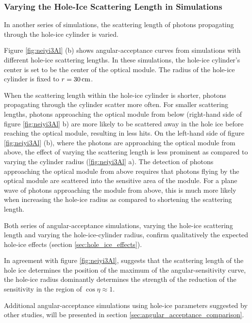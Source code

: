 \subsubsection{Varying the Hole-Ice Scattering Length in Simulations}
\label{sec:vary_sca}

In another series of simulations, the scattering length of photons
propagating through the hole-ice cylinder is varied.


Figure \ref{fig:neiyi3Al} (b) shows angular-acceptance curves from
simulations with different hole-ice scattering lengths. In these
simulations, the hole-ice cylinder's center is set to be the center of
the optical module. The radius of the hole-ice cylinder is fixed to
\(r = 30\text{\,cm}\).

When the scattering length within the hole-ice cylinder is shorter,
photons propagating through the cylinder scatter more often. For smaller
scattering lengths, photons approaching the optical module from below
(right-hand side of figure \ref{fig:neiyi3Al} b) are more likely to be
scattered away in the hole ice before reaching the optical module,
resulting in less hits. On the left-hand side of figure
\ref{fig:neiyi3Al} (b), where the photons are approaching the optical
module from above, the effect of varying the scattering length is less
prominent as compared to varying the cylinder radius (\ref{fig:neiyi3Al}
a). The detection of photons approaching the optical module from above
requires that photons flying by the optical module are scattered into
the sensitive area of the module. For a plane wave of photons
approaching the module from above, this is much more likely when
increasing the hole-ice radius as compared to shortening the scattering
length.

Both series of angular-acceptance simulations, varying the hole-ice
scattering length and varying the hole-ice-cylinder radius, confirm
qualitatively the expected hole-ice effects (section
\ref{sec:hole_ice_effects}).

In agreement with figure \ref{fig:neiyi3Al}, \rongen \cite{pocam}
suggests that the scattering length of the hole ice determines the
position of the maximum of the angular-sensitivity curve, the hole-ice
radius dominantly determines the strength of the reduction of the
sensitivity in the region of \(\cos \eta \approx 1\).

Additional angular-acceptance simulations using hole-ice parameters
suggested by other studies, will be presented in section
\ref{sec:angular_acceptance_comparison}.
